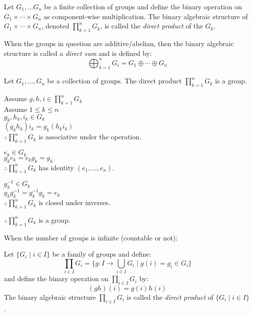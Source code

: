 \documentclass[letterpaper,12pt,fleqn]{article}
\newcommand{\xprod}[1]{\prod_{i\in I}#1_i}
\begin{document}
\begin{definition}
  Let $G_1,\ldots G_n$ be a finite collection of groups and define the binary
  operation on $G_1\times\cdots\times G_n$ as component-wise multiplication.
  The binary algebraic structure of $G_1\times\cdots\times G_n$, denoted
  $\prod_{k=1}^nG_k$, is called the \emph{direct product} of the $G_k$.

  When the groups in question are additive/abelian, then the binary algebraic
  structure is called a \emph{direct sum} and is defined by:
  \[\bigoplus_{k=1}^nG_i=G_1\oplus\cdots\oplus G_n\]
\end{definition}

\begin{theorem}
  Let $G_1,\ldots,G_n$ be a collection of groups. The direct product
  $\prod_{k=1}^nG_k$ is a group.
\end{theorem}

\begin{theproof}
  Assume $g,h,i\in\prod_{k=1}^nG_k$ \\
  Assume $1\le k\le n$ \\
  $g_k,h_k,i_k\in G_k$ \\
  $(g_kh_k)i_k=g_k(h_ki_k)$ \\
  $\therefore \prod_{k=1}^nG_k$ is associative under the operation.

  $e_k\in G_k$ \\
  $g_ke_k=e_kg_k=g_k$ \\
  $\therefore \prod_{k=1}^nG_k$ has identity $(e_1,\ldots,e_n)$.

  $g_k^{-1}\in G_k$ \\
  $g_kg_k^{-1}=g_k^{-1}g_k=e_k$ \\
  $\therefore \prod_{k=1}^nG_k$ is closed under inverses.

  $\therefore \prod_{k=1}^nG_k$ is a group.
\end{theproof}

When the number of groups is infinite (countable or not):

\begin{definition}
  Let $\{G_i\mid i\in I\}$ be a family of groups and define:
  \[\xprod{G}=\{g:I\to \bigcup_{i\in I}G_i\mid g(i)=g_i\in G_i\}\]
  and define the binary operation on $\xprod{G}$ by:
  \[(gh)(i)=g(i)h(i)\]
  The binary algebraic structure $\xprod{G}$ is called the
  \emph{direct product} of $\{G_i\mid i\in I\}$.
\end{definition}
\end{document}
